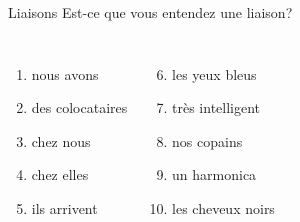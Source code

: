 \begin{frame}{Liaisons}
  Est-ce que vous entendez une liaison? \\
  \begin{columns}
      \begin{enumerate}
        \item nous avons \underline{}
        \item des colocataires \underline{\uncover<3->{non}}
        \item chez nous \underline{}
        \item chez elles \underline{\uncover<5->{oui}}
        \item ils arrivent \underline{}
      \end{enumerate}
      \begin{enumerate}
        \setcounter{enumi}{5}
        \item les yeux bleus \underline{\uncover<7->{oui}}
        \item très intelligent \underline{}
        \item nos copains \underline{}
        \item un harmonica \underline{}
        \item les cheveux noirs \underline{}
      \end{enumerate}
  \end{columns}
\end{frame}